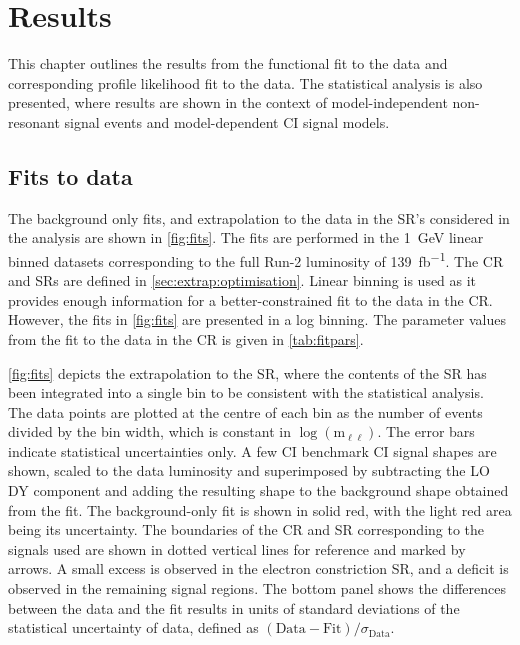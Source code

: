 \chapter{Results}\label{chap:results}
This chapter outlines the results from the functional fit to the data and corresponding profile likelihood fit to the data. The statistical analysis is also presented, where results are shown in the context of model-independent non-resonant signal events and model-dependent CI signal models. 

\section{Fits to data}
The background only fits, and extrapolation to the data in the SR's considered in the analysis are shown in \cref{fig:fits}. The fits are performed in the \SI{1}{\giga\electronvolt} linear binned datasets corresponding to the full Run-2 luminosity of \SI{139}{\femto\barn^{-1}}. The CR and SRs are defined in \cref{sec:extrap:optimisation}. Linear binning is used as it provides enough information for a better-constrained fit to the data in the CR. However, the fits in \cref{fig:fits} are presented in a log binning. The parameter values from the fit to the data in the CR is given in \cref{tab:fitpars}. 

\cref{fig:fits} depicts the extrapolation to the SR, where the contents of the SR has been integrated into a single bin to be consistent with the statistical analysis. The data points are plotted at the centre of each bin as the number of events divided by the bin width, which is constant in $\log{(\text{m}_{\ell\ell})}$. The error bars indicate statistical uncertainties only. A few CI benchmark CI signal shapes are shown, scaled to the data luminosity and superimposed by subtracting the LO DY component and adding the resulting shape to the background shape obtained from the fit. The background-only fit is shown in solid red, with the light red area being its uncertainty. The boundaries of the CR and SR corresponding to the signals used are shown in dotted vertical lines for reference and marked by arrows. A small excess is observed in the electron constriction SR, and a deficit is observed in the remaining signal regions. The bottom panel shows the differences between the data and the fit results in units of standard deviations of the statistical uncertainty of data, defined as $(\mathrm{Data}-\mathrm{Fit})/\sigma_\mathrm{Data}$. 

